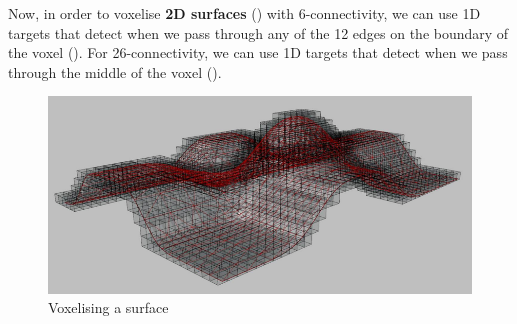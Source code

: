 Now, in order to voxelise \textbf{2D surfaces} () with 6-connectivity, we can use 1D targets that detect when we pass through any of the 12 edges on the boundary of the voxel ().
For 26-connectivity, we can use 1D targets that detect when we pass through the middle of the voxel ().

\begin{figure}
\centering
\includegraphics[width=\linewidth]{figs/surfaces}
\caption{Voxelising a surface}%
\label{fig:surfaces}
\end{figure}

